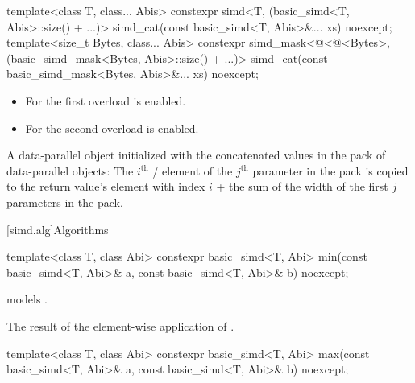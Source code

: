 \begin{itemdecl}
template<class T, class... Abis>
  constexpr simd<T, (basic_simd<T, Abis>::size() + ...)>
    simd_cat(const basic_simd<T, Abis>&... xs) noexcept;
template<size_t Bytes, class... Abis>
  constexpr simd_mask<@\deducet@<@\integerfrom@<Bytes>, (basic_simd_mask<Bytes, Abis>::size() + ...)>
    simd_cat(const basic_simd_mask<Bytes, Abis>&... xs) noexcept;

\end{itemdecl}

\begin{itemdescr}
  \pnum\constraints
  \begin{itemize}
    \item For the first overload  is enabled.

    \item For the second overload  is enabled.
  \end{itemize}

  \pnum\returns
  A data-parallel object initialized with the concatenated values in the  pack of
  data-parallel objects: The $i^\text{th}$ / element of the
  $j^\text{th}$ parameter in the  pack is copied to the return value's element with index
  $i$ + the sum of the width of the first $j$ parameters in the  pack.
\end{itemdescr}

[simd.alg]{Algorithms}

\begin{itemdecl}
template<class T, class Abi>
  constexpr basic_simd<T, Abi> min(const basic_simd<T, Abi>& a,
                                   const basic_simd<T, Abi>& b) noexcept;
\end{itemdecl}

\begin{itemdescr}
  \pnum\constraints
   models .

  \pnum\returns
  The result of the element-wise application of  \foralli.
\end{itemdescr}

\begin{itemdecl}
template<class T, class Abi>
  constexpr basic_simd<T, Abi> max(const basic_simd<T, Abi>& a,
                                   const basic_simd<T, Abi>& b) noexcept;
\end{itemdecl}


